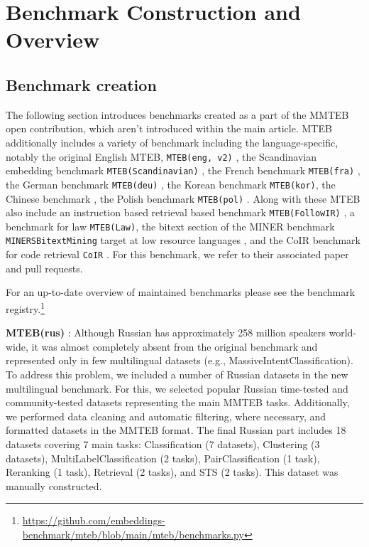 
\section{Benchmark Construction and Overview}
\subsection{Benchmark creation}
\label{sec:benchmark-creation}

The following section introduces benchmarks created as a part of the MMTEB open contribution, which aren't introduced within the main article. MTEB additionally includes a variety of benchmark including the language-specific, notably the original English MTEB, \texttt{MTEB(eng, v2)} \citep{muennighoff2023mteb}, the Scandinavian embedding benchmark \texttt{MTEB(Scandinavian)} \citep{enevoldsen2024scandinavian}, the French benchmark \texttt{MTEB(fra)} \citep{ciancone2024extending}, the German benchmark \texttt{MTEB(deu)} \citep{wehrli2024germantextembeddingclustering}, the Korean benchmark \texttt{MTEB(kor)}, the Chinese benchmark \citep{xiao2024cpack}, the Polish benchmark \texttt{MTEB(pol)} \citep{poswiata2024plmteb}. Along with these MTEB also include an instruction based retrieval based benchmark \texttt{MTEB(FollowIR)} \citep{weller2024followir}, a benchmark for law \texttt{MTEB(Law)}, the bitext section of the MINER benchmark \texttt{MINERSBitextMining} target at low resource languages \citep{winata2024miners}, and the CoIR benchmark for code retrieval \texttt{CoIR} \citep{li2024coircomprehensivebenchmarkcode}. For this benchmark, we refer to their associated paper and pull requests.

For an up-to-date overview of maintained benchmarks please see the benchmark registry.\footnote{\url{https://github.com/embeddings-benchmark/mteb/blob/main/mteb/benchmarks.py}}

\noindent
\textbf{MTEB(rus)} \citep{snegirev2024russianfocusedembeddersexplorationrumteb}: Although Russian has approximately 258 million speakers world-wide, it was almost completely absent from the original benchmark and represented only in few multilingual datasets (e.g., MassiveIntentClassification). To address this problem, we included a number of Russian datasets in the new multilingual benchmark. For this, we selected popular Russian time-tested and community-tested datasets representing the main MMTEB tasks. Additionally, we performed data cleaning and automatic filtering, where necessary, and formatted datasets in the MMTEB format. The final Russian part includes 18 datasets covering 7 main tasks: Classification (7 datasets), Clustering (3 datasets), MultiLabelClassification (2 tasks), PairClassification (1 task), Reranking (1 task), Retrieval (2 tasks), and STS (2 tasks). This dataset was manually constructed.



